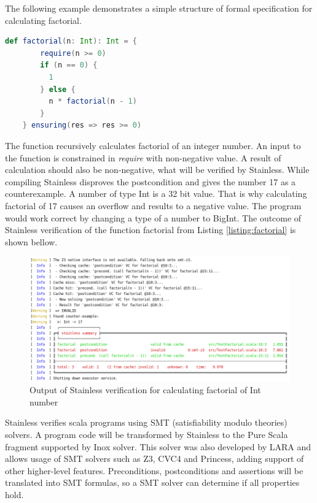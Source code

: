 The following example demonstrates a simple structure of formal specification for calculating factorial.

\begin{lstlisting}[caption=Example of verifying the function calculating factorial of an integer number, label=listing:factorial, captionpos=b, language=Scala]
    def factorial(n: Int): Int = {
        require(n >= 0)
        if (n == 0) {
          1
        } else {
          n * factorial(n - 1)
        }
    } ensuring(res => res >= 0)
\end{lstlisting}

The function recursively calculates factorial of an integer number. An input to the function is constrained in \textit{require} with non-negative value. A result of calculation should also be non-negative, what will be verified by Stainless.
While compiling Stainless disproves the postcondition and gives the number 17 as a counterexample. A number of type Int is a 32 bit value. That is why calculating factorial of 17 causes an overflow and results to a negative value. The program would work correct by changing a type of a number to BigInt.
The outcome of Stainless verification of the function factorial from Listing \ref{listing:factorial} is shown bellow.

\begin{figure}[H]
	\centering
		\includegraphics[scale=0.5]{images/output1.png}
	\caption{Output of Stainless verification for calculating factorial of Int number}
	\label{fig:output1}
\end{figure}


Stainless verifies scala programs using SMT (satisfiability modulo theories) solvers. 
A program code will be transformed by Stainless to the Pure Scala fragment supported by Inox solver. 
This solver was also developed by LARA and allows usage of SMT solvers such as Z3, CVC4 and Princess, adding support of other higher-level features.
Preconditions, postconditions and assertions will be translated into SMT formulas, so a SMT solver can determine if all properties hold.

